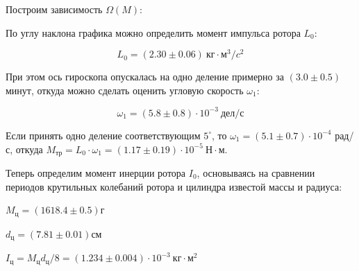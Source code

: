 \documentclass[14pt]{article}
\begin{document}
\vspace{1cm}
Построим зависимость $\Omega(M)$:

\begin{flushleft}
\end{flushleft}

\vspace{0.5cm}
По углу наклона графика можно определить момент импульса ротора $L_0$:

$$\boxed{L_0 = (2.30 \pm 0.06)~\text{кг}\cdot\text{м}^3/c^2}$$

При этом ось гироскопа опускалась на одно деление примерно за $(3.0 \pm 0.5)$ минут, откуда можно сделать оценить угловую скорость $\omega_1$:

$$\omega_1 = (5.8 \pm 0.8)\cdot 10^{-3}~\text{дел/с}$$

Если принять одно деление соответствующим $5^{\circ}$, то $\omega_1 = (5.1 \pm 0.7)\cdot 10^{-4}$ рад/с, откуда 
$M_{\text{тр}} = L_0 \cdot \omega_1 = (1.17 \pm 0.19)\cdot 10^{-5}~\text{Н}\cdot\text{м}$.

\vspace{0.5cm}
Теперь определим момент инерции ротора $I_0$, основываясь на сравнении периодов крутильных колебаний ротора и цилиндра известой массы и радиуса:

$M_\text{ц} = (1618.4 \pm 0.5)\text{г}$

$d_\text{ц} = (7.81  \pm 0.01)\text{см}$

$I_\text{ц} = M_\text{ц}d_\text{ц}/8 = (1.234 \pm 0.004) \cdot 10^{-3}~\text{кг}\cdot\text{м}^2$
\end{document}

